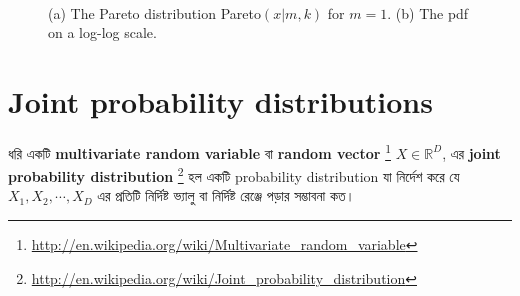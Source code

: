 \documentclass[graybox, envcountchap, twocolumn]{styles/svmult}
\begin{document}
\begin{figure}[hbtp]
\centering
{} \\
\caption{(a) The Pareto distribution Pareto$(x|m, k)$ for $m=1$. (b) The pdf on a log-log scale.}
\label{fig:Pareto-distribution} 
\end{figure}


\section{Joint probability distributions}
{\bengalifont ধরি একটি \textbf{multivariate random variable} বা \textbf{random vector} \footnote{\url{http://en.wikipedia.org/wiki/Multivariate_random_variable}} $X \in \mathbb{R}^D$, এর \textbf{joint probability distribution} \footnote{\url{http://en.wikipedia.org/wiki/Joint_probability_distribution}} হল একটি probability distribution যা নির্দেশ করে যে $X_1, X_2, \cdots,X_D$ এর প্রতিটি নির্দিষ্ট ভ্যালু বা নির্দিষ্ট রেঞ্জে পড়ার সম্ভাবনা কত। }
\end{document}
